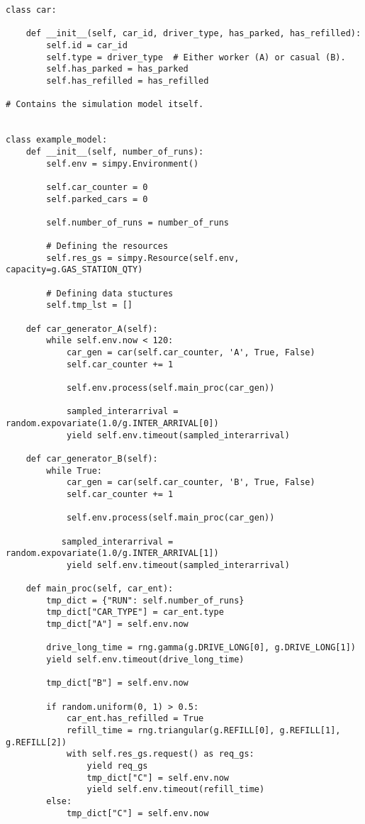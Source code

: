 \begin{verbatim}
class car:

    def __init__(self, car_id, driver_type, has_parked, has_refilled):
        self.id = car_id
        self.type = driver_type  # Either worker (A) or casual (B).
        self.has_parked = has_parked
        self.has_refilled = has_refilled

# Contains the simulation model itself.


class example_model:
    def __init__(self, number_of_runs):
        self.env = simpy.Environment()

        self.car_counter = 0
        self.parked_cars = 0

        self.number_of_runs = number_of_runs

        # Defining the resources
        self.res_gs = simpy.Resource(self.env, capacity=g.GAS_STATION_QTY)

        # Defining data stuctures
        self.tmp_lst = []

    def car_generator_A(self):
        while self.env.now < 120:
            car_gen = car(self.car_counter, 'A', True, False)
            self.car_counter += 1

            self.env.process(self.main_proc(car_gen))

            sampled_interarrival = random.expovariate(1.0/g.INTER_ARRIVAL[0])
            yield self.env.timeout(sampled_interarrival)

    def car_generator_B(self):
        while True:
            car_gen = car(self.car_counter, 'B', True, False)
            self.car_counter += 1

            self.env.process(self.main_proc(car_gen))

           sampled_interarrival = random.expovariate(1.0/g.INTER_ARRIVAL[1])
            yield self.env.timeout(sampled_interarrival)

    def main_proc(self, car_ent):
        tmp_dict = {"RUN": self.number_of_runs}
        tmp_dict["CAR_TYPE"] = car_ent.type
        tmp_dict["A"] = self.env.now

        drive_long_time = rng.gamma(g.DRIVE_LONG[0], g.DRIVE_LONG[1])
        yield self.env.timeout(drive_long_time)

        tmp_dict["B"] = self.env.now

        if random.uniform(0, 1) > 0.5:
            car_ent.has_refilled = True
            refill_time = rng.triangular(g.REFILL[0], g.REFILL[1], g.REFILL[2])
            with self.res_gs.request() as req_gs:
                yield req_gs
                tmp_dict["C"] = self.env.now
                yield self.env.timeout(refill_time)
        else:
            tmp_dict["C"] = self.env.now


\end{verbatim}
